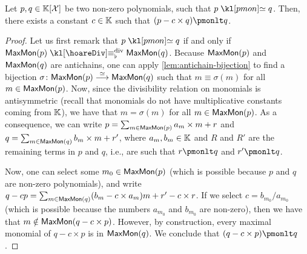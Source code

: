 \begin{lemma}
   \label{lem:polynomial-division}
   Let $p, q \in \Poly{\Indets}$ be two non-zero polynomials,
   such that $p \pmoneq q$.
    Then, there exists a constant $c \in \mathbb{K}$ such that
    $(p - c \times q) \pmonlt q$.
\end{lemma}
\begin{proof}
    Let us first remark that $p \pmoneq q$ if and only if
     $\MaxMon(p) \hoareDivEq \MaxMon(q)$.
    Because $\mathsf{MaxMon}(p)$ and $\mathsf{MaxMon}(q)$ are antichains,
    one can apply \cref{lem:antichain-bijection} to find
    a bijection $\sigma \colon \mathsf{MaxMon}(p) \stackrel{\simeq}{\longrightarrow} \mathsf{MaxMon}(q)$
    such that $m \equiv \sigma(m)$ for all $m \in \mathsf{MaxMon}(p)$.
    Now, since the divisibility relation on monomials
    is antisymmetric (recall that monomials do not 
    have multiplicative constants coming from $\mathbb{K}$), we have that $m = \sigma(m)$
    for all $m \in \mathsf{MaxMon}(p)$. 
    As a consequence, we can write $p = \sum_{m \in \mathsf{MaxMon}(p)} a_m \times m +
    r$ and $q = \sum_{m \in \mathsf{MaxMon}(q)} b_m \times m + r'$, where $a_m, b_m \in
    \mathbb{K}$ and $R$ and $R'$ are the remaining terms in $p$ and $q$, i.e., are
    such that $r \pmonlt q$ and $r' \pmonlt q$.

    Now, one can select some $m_0 \in \mathsf{MaxMon}(p)$ (which is possible because
    $p$ and $q$ are non-zero polynomials), and write
    $q - c p = \sum_{m \in \mathsf{MaxMon}(q)} (b_m - c \times a_m) m + r' - c \times r$.
    If we select $c = b_{m_0}/ a_{m_0}$ (which is possible because 
    the numbers $a_{m_0}$ and $b_{m_0}$ are non-zero), then we have that 
    $m \notin \mathsf{MaxMon}(q - c \times p)$. However, by construction,
    every maximal monomial of $q - c \times p$ is in $\mathsf{MaxMon}(q)$.
    We conclude that $(q - c \times p) \pmonlt q$.
\end{proof}

